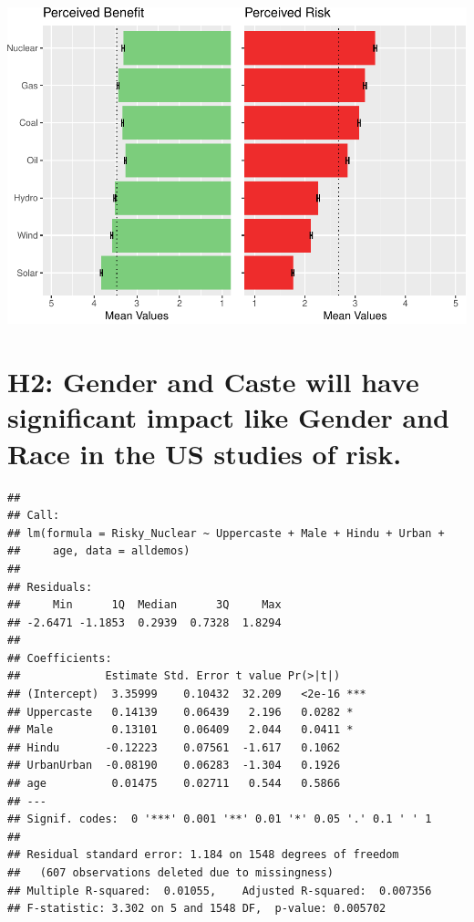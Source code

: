 \documentclass[
]{article}
\begin{document}
\includegraphics{Paper1_files/figure-latex/unnamed-chunk-6-1.pdf}

\newpage

\hypertarget{h2-gender-and-caste-will-have-significant-impact-like-gender-and-race-in-the-us-studies-of-risk.}{%
\section{H2: Gender and Caste will have significant impact like Gender
and Race in the US studies of
risk.}\label{h2-gender-and-caste-will-have-significant-impact-like-gender-and-race-in-the-us-studies-of-risk.}}

\begin{verbatim}
## 
## Call:
## lm(formula = Risky_Nuclear ~ Uppercaste + Male + Hindu + Urban + 
##     age, data = alldemos)
## 
## Residuals:
##     Min      1Q  Median      3Q     Max 
## -2.6471 -1.1853  0.2939  0.7328  1.8294 
## 
## Coefficients:
##             Estimate Std. Error t value Pr(>|t|)    
## (Intercept)  3.35999    0.10432  32.209   <2e-16 ***
## Uppercaste   0.14139    0.06439   2.196   0.0282 *  
## Male         0.13101    0.06409   2.044   0.0411 *  
## Hindu       -0.12223    0.07561  -1.617   0.1062    
## UrbanUrban  -0.08190    0.06283  -1.304   0.1926    
## age          0.01475    0.02711   0.544   0.5866    
## ---
## Signif. codes:  0 '***' 0.001 '**' 0.01 '*' 0.05 '.' 0.1 ' ' 1
## 
## Residual standard error: 1.184 on 1548 degrees of freedom
##   (607 observations deleted due to missingness)
## Multiple R-squared:  0.01055,    Adjusted R-squared:  0.007356 
## F-statistic: 3.302 on 5 and 1548 DF,  p-value: 0.005702
\end{verbatim}
\end{document}
